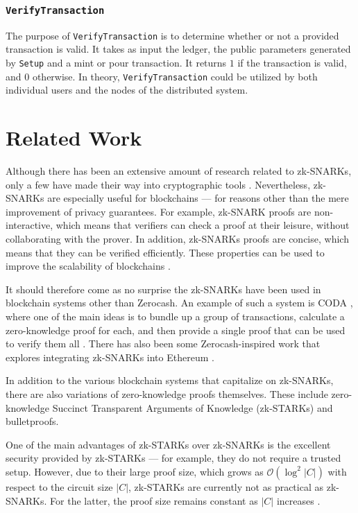 \documentclass{article}
\begin{document}
\subsubsection{\texttt{VerifyTransaction}}
The purpose of \texttt{VerifyTransaction} is to determine whether or not a provided transaction is valid. It takes as input the ledger, the public parameters generated by \texttt{Setup} and a mint or pour transaction. It returns $1$ if the transaction is valid, and $0$ otherwise. In theory, \texttt{VerifyTransaction} could be utilized by both individual users and the nodes of the distributed system.

\section{Related Work}
Although there has been an extensive amount of research related to zk-SNARKs, only a few have made their way into cryptographic tools \cite{zk-snarks-blockchains-chapter}. Nevertheless, zk-SNARKs are especially useful for blockchains --- for reasons other than the mere improvement of privacy guarantees. For example, zk-SNARK proofs are non-interactive, which means that verifiers can check a proof at their leisure, without collaborating with the prover. In addition, zk-SNARKs proofs are concise, which means that they can be verified efficiently. These properties can be used to improve the scalability of blockchains \cite{zk-snarks-blockchains-chapter}.

It should therefore come as no surprise the zk-SNARKs have been used in blockchain systems other than Zerocash. An example of such a system is CODA \cite{coda}, where one of the main ideas is to bundle up a group of transactions, calculate a zero-knowledge proof for each, and then provide a single proof that can be used to verify them all \cite{zk-snarks-blockchains-chapter}. There has also been some Zerocash-inspired work that explores integrating zk-SNARKs into Ethereum \cite{zeth}.

In addition to the various blockchain systems that capitalize on zk-SNARKs, there are also variations of zero-knowledge proofs themselves. These include zero-knowledge Succinct Transparent Arguments of Knowledge (zk-STARKs) and bulletproofs.

One of the main advantages of zk-STARKs over zk-SNARKs is the excellent security provided by zk-STARKs --- for example, they do not require a trusted setup. However, due to their large proof size, which grows as $\mathcal{O}(\log^ 2{|C|})$ with respect to the circuit size $|C|$, zk-STARKs are currently not as practical as zk-SNARKs. For the latter, the proof size remains constant as $|C|$ increases \cite{zk-snarks-blockchains-chapter}.
\end{document}
